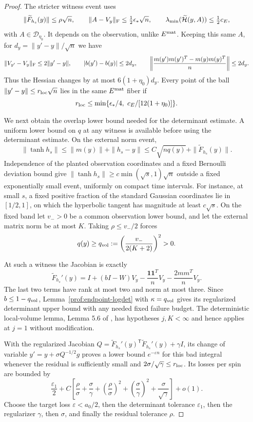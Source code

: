 \begin{proof}
The stricter witness event uses
\[
 \|\widetilde F_{h_s}(y)\|\le\rho\sqrt n,\qquad
 \|A-V_y\|_{\rm F}\le\tfrac12\epsilon_*\sqrt n,\qquad
 \lambda_{\min}(\widetilde{\mathcal H}(y,A))\le\tfrac12c_E,
\]
with \(A\in\mathcal D_{\eta_0}\). It depends on the observation,
unlike \(E^{\rm mat}\). Keeping this same \(A\), for
\(d_y=\|y'-y\|/\sqrt n\) we have
\[
 \|V_{y'}-V_y\|_{\rm F}\le2\|y'-y\|,\qquad
 |b(y')-b(y)|\le2d_y,\qquad
 \left\|\frac{m(y')m(y')^T-m(y)m(y)^T}{n}\right\|\le2d_y.
\]
Thus the Hessian changes by at most \(6(1+\eta_0)d_y\).
Every point of the ball
\(\|y'-y\|\le r_{\rm loc}\sqrt n\) lies in the same
\(E^{\rm mat}\) fiber if
\[
 r_{\rm loc}\le
 \min\{\epsilon_*/4,\ c_E/[12(1+\eta_0)]\}.
\]

We next obtain the overlap lower bound needed for the determinant estimate.
A uniform lower bound on $q$ at any witness is available before
using the determinant estimate.  On the external norm event,
\[
 \|\tanh h_s\|\le\|m(y)\|+\|h_s-y\|
 \le C\sqrt{nq(y)}+\|\widetilde F_{h_s}(y)\|.
\]
Independence of the planted observation coordinates and a fixed
Bernoulli deviation bound give
$\|\tanh h_s\|\ge c\min(\sqrt s,1)\sqrt n$ outside a fixed
exponentially small event, uniformly on compact time intervals.
For instance, at small $s$, a fixed positive fraction of the
standard Gaussian coordinates lie in $[1/2,1]$, on which the
hyperbolic tangent has magnitude at least $c\sqrt s$.
On the fixed band let \(v_->0\) be a common observation lower
bound, and let the external matrix norm be at most \(K\).
Taking \(\rho\le v_-/2\) forces
\[
 q(y)\ge q_{\rm vol}:=
       \left(\frac{v_-}{2(K+2)}\right)^2>0.
\]

At such a witness the Jacobian is exactly
\[
 \widetilde F_{h_s}'(y)
 =I+(bI-W)V_y-\frac{\mathbf1\mathbf1^T}{n}V_y
                    -\frac{2mm^T}{n}V_y.
\]
The last two terms have rank at most two and norm at most three.
Since \(b\le1-q_{\rm vol}\), Lemma~\ref{prof:endpoint-logdet}
with \(\kappa=q_{\rm vol}\) gives its regularized determinant
upper bound with any needed fixed failure budget.
The deterministic local-volume lemma, Lemma 5.6 of
\cite{AcceptedGap}, has hypotheses $j,K<\infty$ and hence
applies at $j=1$ without modification.

With the regularized
Jacobian $Q=\widetilde F_{h_s}'(y)^{\mathsf T}
              \widetilde F_{h_s}'(y)+\gamma I$, its change of variable
$y'=y+\sigma Q^{-1/2}g$ proves a lower bound $e^{-\varepsilon n}$
for this bad integral whenever the residual is sufficiently small
and \(2\sigma/\sqrt\gamma\le r_{\rm loc}\).
Its losses per spin are bounded by
\[
 \frac{\varepsilon_1}{2}
 +C\left[\frac\rho\sigma+\frac\sigma\gamma+
       \left(\frac\rho\sigma\right)^2+
       \left(\frac\sigma\gamma\right)^2+
       \frac\sigma{\sqrt\gamma}\right]+o(1).
\]
Choose the target loss \(\varepsilon<a_0/2\), then the
determinant tolerance $\varepsilon_1$, then the regularizer $\gamma$,
then $\sigma$, and finally the residual tolerance $\rho$.


\end{proof}
